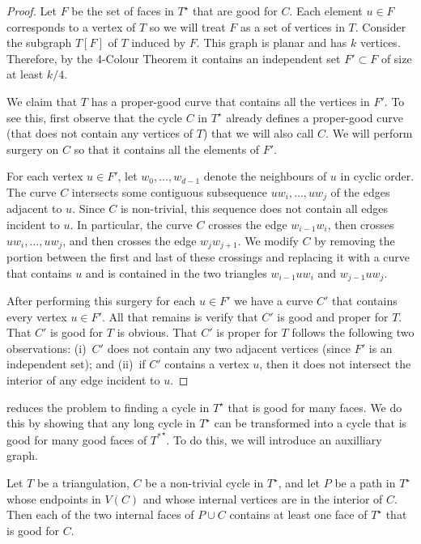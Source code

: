 \documentclass{patmorin}
\newcommand{\dual}[1]{{#1}^\star}
\begin{document}
\begin{proof}
  Let $F$ be the set of faces in $\dual{T}$ that are good for $C$. Each
  element $u\in F$ corresponds to a vertex of $T$ so we will treat $F$
  as a set of vertices in $T$.  Consider the subgraph $T[F]$ of $T$
  induced by $F$.  This graph is planar and has $k$ vertices. Therefore,
  by the 4-Colour Theorem it contains an independent set $F'\subset F$
  of size at least $k/4$.

  We claim that $T$ has a proper-good curve that contains all the vertices
  in $F'$.  To see this, first observe that the cycle $C$ in $\dual{T}$
  already defines a proper-good curve (that does not contain any vertices
  of $T$) that we will also call $C$.  We will perform surgery on $C$
  so that it contains all the elements of $F'$.

  For each vertex $u\in F'$, let $w_0,\ldots,w_{d-1}$ denote the
  neighbours of $u$ in cyclic order.  The curve $C$ intersects some
  contiguous subsequence $uw_i,\ldots,uw_j$ of the edges adjacent
  to $u$.  Since $C$ is non-trivial, this sequence does not contain all
  edges incident to $u$. In particular, the curve $C$ crosses the edge
  $w_{i-1}w_i$, then crosses
  $uw_i,\ldots,uw_j$, and then crosses the edge $w_j w_{j+1}$.  We modify
  $C$ by removing the portion between the first and last of these crossings
  and replacing it with a curve that contains $u$ and is contained in the
  two triangles $w_{i-1}uw_i$ and $w_{j-1}uw_j$.

  After performing this surgery for each $u\in F'$ we have a curve $C'$
  that contains every vertex $u\in F'$.  All that remains is verify that
  $C'$ is good and proper for $T$. That $C'$ is good for $T$ is
  obvious.  That $C'$ is proper for $T$ follows the following two observations:
  (i)~$C'$ does not contain any two adjacent vertices (since $F'$ is an
  independent set); and (ii)~if $C'$ contains a vertex $u$, then it does
  not intersect the interior of any edge incident to $u$.
\end{proof}

 reduces the problem to finding a cycle in
$\dual{T}$ that is good for many faces.  We do this by showing that any
long cycle in $\dual{T}$ can be transformed into a cycle that is good
for many good faces of $\dual{T^*}$.  To do this, we will introduce an
auxilliary graph.

\begin{lem}
   Let $T$ be a triangulation, $C$ be a non-trivial cycle in $\dual{T}$,
   and let $P$ be a path in $\dual{T}$ whose endpoints in $V(C)$ and whose
   internal vertices are in the interior of $C$.  Then each of the two
   internal faces of $P\cup C$ contains at least one face of $\dual{T}$
   that is good for $C$.
\end{lem}
\end{document}

